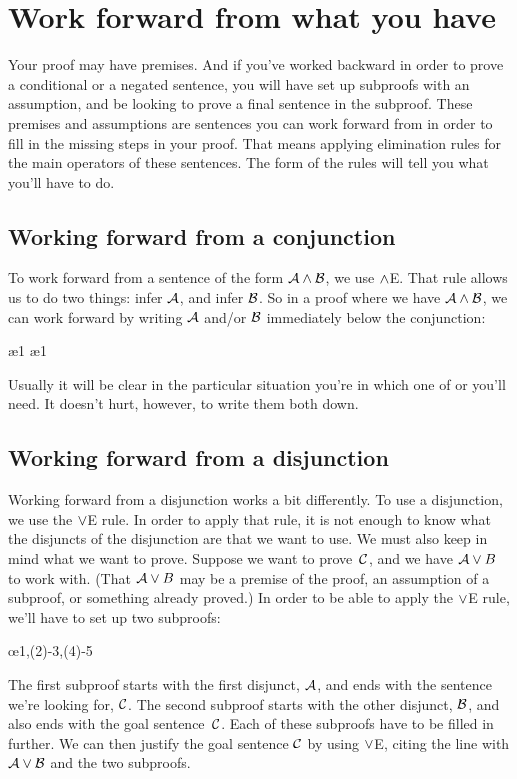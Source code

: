 \section{Work forward from what you have}

Your proof may have premises. And if you've worked backward in order to prove a conditional or a negated sentence, you will have set up subproofs with an assumption, and be looking to prove a final sentence in the subproof. These premises and assumptions are sentences you can work forward from in order to fill in the missing steps in your proof. That means applying elimination rules for the main operators of these sentences. The form of the rules will tell you what you'll have to do.

\subsection*{Working forward from a conjunction}

To work forward from a sentence of the form $\mathcal{A} \wedge \mathcal{B}$, we use $\wedge$E. That rule allows us to do two things: infer $\mathcal{A}$, and infer $\mathcal{B}$. So in a proof where we have $\mathcal{A} \wedge \mathcal{B}$, we can work forward by writing $\mathcal{A}$ and/or $\mathcal{B}$ immediately below the conjunction:
\begin{fitchproof}
  \ae{1}
  \ae{1}
\end{fitchproof}
Usually it will be clear in the particular situation you're in which one of  or  you'll need. It doesn't hurt, however, to write them both down.

\subsection*{Working forward from a disjunction}

Working forward from a disjunction works a bit differently. To use a disjunction, we use the $\vee$E rule. In order to apply that rule, it is not enough to know what the disjuncts of the disjunction are that we want to use. We must also keep in mind what we want to prove. Suppose we want to prove~$\mathcal{C}$, and we have $\mathcal{A} \vee B$ to work with. (That $\mathcal{A} \vee B$ may be a premise of the proof, an assumption of a subproof, or something already proved.) In order to be able to apply the $\vee$E rule, we'll have to set up two subproofs:
\begin{fitchproof}
	\open
	\ellipsesline 
	\close 
	\open
	\ellipsesline
	\close
	\oe{1,(2)-3,(4)-5} 
\end{fitchproof} 
The first subproof starts with the first disjunct, $\mathcal{A}$, and ends with the sentence we're looking for, $\mathcal{C}$. The second subproof starts with the other disjunct, $\mathcal{B}$, and also ends with the goal sentence~$\mathcal{C}$. Each of these subproofs have to be filled in further. We can then justify the goal sentence $\mathcal{C}$ by using $\vee$E, citing the line with $\mathcal{A} \vee \mathcal{B}$ and the two subproofs.


